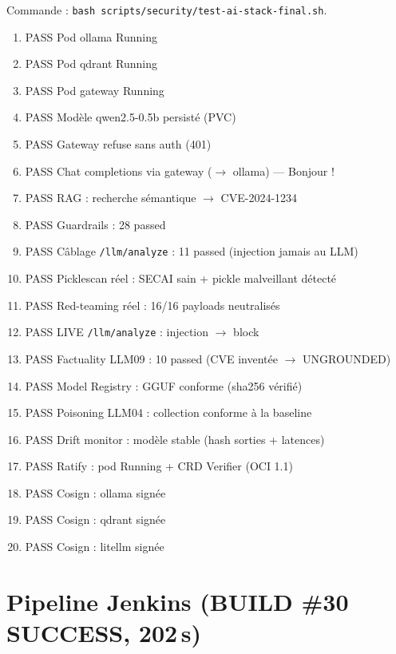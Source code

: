 \documentclass[12pt,a4paper,openany]{report}
\begin{document}
Commande : \texttt{bash scripts/security/test-ai-stack-final.sh}.

\begin{enumerate}
  \item PASS Pod ollama Running
  \item PASS Pod qdrant Running
  \item PASS Pod gateway Running
  \item PASS Modèle qwen2.5-0.5b persisté (PVC)
  \item PASS Gateway refuse sans auth (401)
  \item PASS Chat completions via gateway ($\rightarrow$ ollama) — \og Bonjour ! \fg
  \item PASS RAG : recherche sémantique $\rightarrow$ CVE-2024-1234
  \item PASS Guardrails : 28 passed
  \item PASS Câblage \texttt{/llm/analyze} : 11 passed (injection jamais au LLM)
  \item PASS Picklescan réel : SECAI sain + pickle malveillant détecté
  \item PASS Red-teaming réel : 16/16 payloads neutralisés
  \item PASS LIVE \texttt{/llm/analyze} : injection $\rightarrow$ block
  \item PASS Factuality LLM09 : 10 passed (CVE inventée $\rightarrow$ UNGROUNDED)
  \item PASS Model Registry : GGUF conforme (sha256 vérifié)
  \item PASS Poisoning LLM04 : collection conforme à la baseline
  \item PASS Drift monitor : modèle stable (hash sorties + latences)
  \item PASS Ratify : pod Running + CRD Verifier (OCI 1.1)
  \item PASS Cosign : ollama signée
  \item PASS Cosign : qdrant signée
  \item PASS Cosign : litellm signée
\end{enumerate}

\section{Pipeline Jenkins (BUILD \#30 SUCCESS, 202\,s)}
\end{document}
